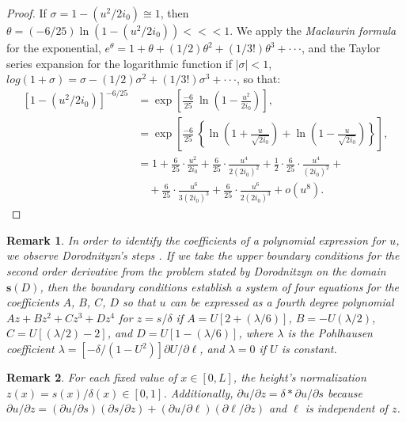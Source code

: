 \documentclass{article}
\newtheorem{remark}{Remark}
\begin{document}
\begin{proof}
If $\sigma=1-(u^2/2i_0)\cong 1$, then $\theta =(-6/25)\ln
    \left(1-(u^2/2i_0)\right)<\!\!<\!\!<1 $. We apply 
the \emph{Maclaurin formula} for the exponential,
$e^{\theta}=1+\theta+(1/2)\theta^2+(1/3!)\theta^3+\cdot \cdot \cdot$,
and the Taylor series expansion for the logarithmic function if $|\sigma|<1$, $log(1+\sigma)=\sigma-(1/2)\sigma^2+(1/3!)\sigma^3+\cdot \cdot \cdot$, so that:
\begin{equation*}
\begin{split}
 \left[1-\left(u^2/2i_0\right)\right]^{-6/25}&=
    \exp\left[\frac{-6}{25}\ \ln
    \left(1-\frac{u^2}{2i_0}\right)\right],\\
    &=
    \exp\left[\frac{-6}{25}\ \left\{\ln
    \left(1+\frac{u}{\sqrt{2i_0}}\right)+\ln
    \left(1-\frac{u}{\sqrt{2i_0}}\right)\right\}\right],\\
    &=
    1+\frac{6}{25}\cdot \frac{u^2}{2i_0}
    +\frac{6}{25}\cdot \frac{u^4}{2(2i_0)^2}
    +\frac{1}{2}\cdot\frac{6}{25}\cdot \frac{u^4}{(2i_0)^2}+\\
    & \quad +\frac{6}{25}\cdot \frac{u^6}{3(2i_0)^3}+\frac{6}{25}\cdot \frac{u^6}{2(2i_0)^3}+o(u^8).  
\end{split}
\end{equation*}
\end{proof}

\begin{remark}
In order to identify the coefficients of a polynomial expression for $u$,
we observe Dorodnityzn's steps \cite{Dorod42,Lees50}.
If we take the upper boundary conditions for the second order derivative from the pro\-blem stated by Dorodnitzyn on the domain $\mathbf{s}(D)$, then the boundary conditions establish a system of four equations for the coefficients $A$, $B$, $C$, $D$
so that $u$ can be expressed as a fourth degree polynomial $Az+Bz^2+Cz^3+Dz^4$ for $z=s/\delta$
if $A=U\left[2+\left(\lambda/6\right)\right]$, $B=-U\left(\lambda/2\right)$, $C=U\left[\left(\lambda/2\right)-2\right]$, and $D=U\left[1-\left(\lambda/6\right)\right]$,
where 
$\lambda$ is the Pohlhausen coefficient
$\lambda=\left[-\delta/\left(1-U^2\right)\right]\partial U/\partial \ell$,
and $\lambda=0$ if $U$ is constant.
\end{remark}

\begin{remark}
For each fixed value of $x\in [0,L]$, the height's normalization $z(x)=s(x)/\delta(x) \in [0,1]$.
Additionally, $\partial u/\partial z=\delta * \partial u/\partial s$ because
$\partial u/\partial z=(\partial u/\partial s)(\partial s/\partial z)+(\partial u/\partial \ell)(\partial \ell/\partial z)$ and $\ell$ is independent of $z$.
\end{remark}
\end{document}
